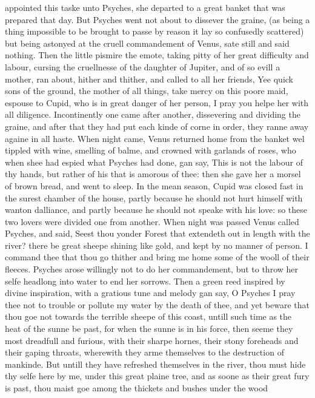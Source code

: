 appointed this taske unto Psyches, she departed to a great banket that was
prepared that day. But Psyches went not about to dissever the graine, (as being
a thing impossible to be brought to passe by reason it lay so confusedly
scattered) but being astonyed at the cruell commandement of Venus, sate still
and said nothing. Then the little pismire the emote, taking pitty of her great
difficulty and labour, cursing the cruellnesse of the daughter of Jupiter, and
of so evill a mother, ran about, hither and thither, and called to all her
friends, Yee quick sons of the ground, the mother of all things, take mercy on
this poore maid, espouse to Cupid, who is in great danger of her person, I pray
you helpe her with all diligence. Incontinently one came after another,
dissevering and dividing the graine, and after that they had put each kinde of
corne in order, they ranne away againe in all haste. When night came, Venus
returned home from the banket wel tippled with wine, smelling of balme, and
crowned with garlands of roses, who when shee had espied what Psyches had done,
gan say, This is not the labour of thy hands, but rather of his that is amorous
of thee: then she gave her a morsel of brown bread, and went to sleep. In the
mean season, Cupid was closed fast in the surest chamber of the house, partly
because he should not hurt himself with wanton dalliance, and partly because he
should not speake with his love: so these two lovers were divided one from
another. When night was passed Venus called Psyches, and said, Seest thou
yonder Forest that extendeth out in length with the river? there be great
sheepe shining like gold, and kept by no manner of person. I command thee that
thou go thither and bring me home some of the wooll of their fleeces. Psyches
arose willingly not to do her commandement, but to throw her selfe headlong
into water to end her sorrows. Then a green reed inspired by divine
inspiration, with a gratious tune and melody gan say, O Psyches I pray thee not
to trouble or pollute my water by the death of thee, and yet beware that thou
goe not towards the terrible sheepe of this coast, untill such time as the heat
of the sunne be past, for when the sunne is in his force, then seeme they most
dreadfull and furious, with their sharpe hornes, their stony foreheads and
their gaping throats, wherewith they arme themselves to the destruction of
mankinde. But untill they have refreshed themselves in the river, thou must
hide thy selfe here by me, under this great plaine tree, and as soone as their
great fury is past, thou maist goe among the thickets and bushes under the wood
